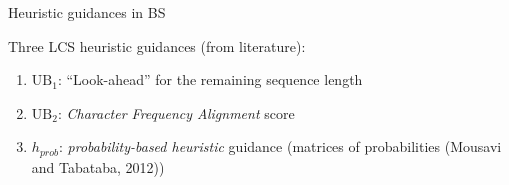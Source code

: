 \documentclass{beamer}
\begin{document}
\begin{frame}{Heuristic guidances in BS}
    
    Three LCS heuristic guidances (from literature): \vspace{0.2cm}
        \begin{enumerate}
       	    \item  $\textrm{UB}_1 $: ``Look-ahead'' for the remaining sequence length
        	\vspace{0.3cm}
    	  	\item   $\textrm{UB}_2$: \textit{Character Frequency Alignment} score
    	   
    	 
    	   \item $h_{prob}$: \textit{probability-based heuristic} guidance (matrices of probabilities (Mousavi and Tabataba, 2012)) %
    \end{enumerate}
\end{frame}
\end{document}
